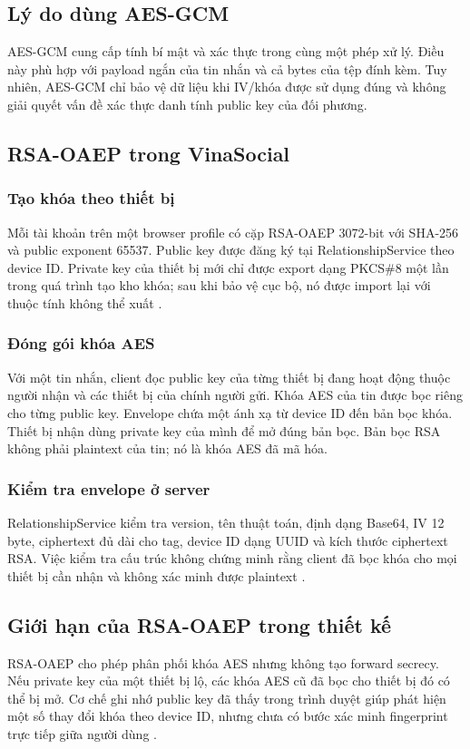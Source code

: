 \subsection{Lý do dùng AES-GCM}
AES-GCM cung cấp tính bí mật và xác thực trong cùng một phép xử lý. Điều này phù hợp với payload ngắn của tin nhắn và cả bytes của tệp đính kèm. Tuy nhiên, AES-GCM chỉ bảo vệ dữ liệu khi IV/khóa được sử dụng đúng và không giải quyết vấn đề xác thực danh tính public key của đối phương.

\subsection{RSA-OAEP trong VinaSocial}
\subsubsection{Tạo khóa theo thiết bị}
Mỗi tài khoản trên một browser profile có cặp RSA-OAEP 3072-bit với SHA-256 và public exponent 65537. Public key được đăng ký tại RelationshipService theo device ID. Private key của thiết bị mới chỉ được export dạng PKCS\#8 một lần trong quá trình tạo kho khóa; sau khi bảo vệ cục bộ, nó được import lại với thuộc tính không thể xuất \cite{e2ee}.

\subsubsection{Đóng gói khóa AES}
Với một tin nhắn, client đọc public key của từng thiết bị đang hoạt động thuộc người nhận và các thiết bị của chính người gửi. Khóa AES của tin được bọc riêng cho từng public key. Envelope chứa một ánh xạ từ device ID đến bản bọc khóa. Thiết bị nhận dùng private key của mình để mở đúng bản bọc. Bản bọc RSA không phải plaintext của tin; nó là khóa AES đã mã hóa.

\subsubsection{Kiểm tra envelope ở server}
RelationshipService kiểm tra version, tên thuật toán, định dạng Base64, IV 12 byte, ciphertext đủ dài cho tag, device ID dạng UUID và kích thước ciphertext RSA. Việc kiểm tra cấu trúc không chứng minh rằng client đã bọc khóa cho mọi thiết bị cần nhận và không xác minh được plaintext \cite{e2ee}.

\subsection{Giới hạn của RSA-OAEP trong thiết kế}
RSA-OAEP cho phép phân phối khóa AES nhưng không tạo forward secrecy. Nếu private key của một thiết bị lộ, các khóa AES cũ đã bọc cho thiết bị đó có thể bị mở. Cơ chế ghi nhớ public key đã thấy trong trình duyệt giúp phát hiện một số thay đổi khóa theo device ID, nhưng chưa có bước xác minh fingerprint trực tiếp giữa người dùng \cite{relationship}.

